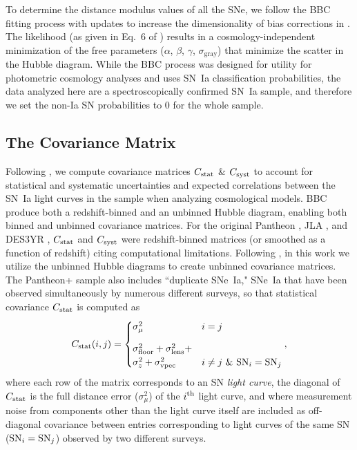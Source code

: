 \documentclass[twocolumn]{aastex63}
\begin{document}
To determine the distance modulus values of all the SNe, we follow the BBC fitting process with updates to increase the dimensionality of bias corrections in \cite{popovic21a}. The likelihood (as given in Eq.~6 of \citealp{BBC}) results in a cosmology-independent minimization of the free parameters ($\alpha$, $\beta$, $\gamma$, $\sigma_{\textrm{gray}}$) that minimize the scatter in the Hubble diagram. 
While the BBC process was designed for utility for photometric cosmology analyses and uses SN~Ia classification probabilities, the data analyzed here are a spectroscopically confirmed SN~Ia sample, and therefore we set the non-Ia SN probabilities to 0 for the whole sample. 



\subsection{The Covariance Matrix}

Following \cite{Conley11}, we compute covariance matrices $C_{\rm stat}$ \& $C_{\rm syst}$ to account for statistical and systematic uncertainties and expected correlations between the SN~Ia light curves in the sample when analyzing cosmological models. {BBC produce both a redshift-binned and an unbinned Hubble diagram, enabling both binned and unbinned covariance matrices.
For the original Pantheon \citep{Scolnic18}, JLA \citep{Betoule14}, and DES3YR \citep{Brout18b}, $C_{\rm stat}$ and $C_{\rm syst}$ were redshift-binned matrices (or smoothed as a function of redshift) citing computational limitations. Following \cite{binning21}, in this work we utilize the unbinned Hubble diagrams to create unbinned covariance matrices.} The Pantheon+ sample \citep{plussample} also includes ``duplicate SNe~Ia," SNe~Ia that have been observed simultaneously by numerous different surveys, so that statistical covariance $C_{\rm stat}$ is computed as
\begin{equation}
        C_{\rm stat}(i,j) =
        \begin{cases}
            \vspace{3mm}
            \sigma_\mu^2 & i=j \\
            \sigma^2_{\rm floor}+ \sigma^2_{\rm lens}+\\ \sigma^2_z+\sigma^2_{\rm vpec} & i\neq j~\&~{\rm SN}_i={\rm SN}_j
        \end{cases} ,
\end{equation}
where each row of the matrix corresponds to an SN \textit{light curve}, the diagonal of $C_{\rm stat}$ is the full distance error ($\sigma_\mu^2$) of the $i^{\rm th}$ light curve, and {where measurement noise from components other than the light curve itself are included as} off-diagonal covariance between entries corresponding to light curves of the same SN (${\rm SN}_i={\rm SN}_j$) observed by two different surveys.
\end{document}

